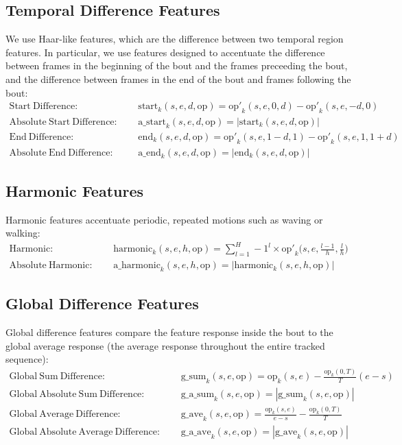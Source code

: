 \documentclass[10pt, onecolumn]{article}
\newcommand{\1}{\textbf{1}}
\begin{document}
\subsection{Temporal Difference Features}
We use Haar-like features, which are the difference between two temporal region features.  In particular, we use features designed to accentuate the difference between frames in the beginning of the bout and the frames preceeding the bout, and the difference between frames in the end of the bout and frames following the bout:
\begin{eqnarray*}
 \mathrm{Start\ Difference:\ \ } &&\mathrm{start}_k(s,e,d,\mathrm{op}) = \mathrm{op'}_k(s,e,0,d) - \mathrm{op'}_k(s,e,-d,0) \\
 \mathrm{Absolute\ Start\ Difference:\ \ } &&\mathrm{a\_start}_k(s,e,d,\mathrm{op}) = |\mathrm{start}_k(s,e,d,\mathrm{op})| \\
 \mathrm{End\ Difference:\ \ } &&\mathrm{end}_k(s,e,d,\mathrm{op}) = \mathrm{op'}_k(s,e,1-d,1) - \mathrm{op'}_k(s,e,1,1+d)\\
 \mathrm{Absolute\ End\ Difference:\ \ } &&\mathrm{a\_end}_k(s,e,d,\mathrm{op}) = |\mathrm{end}_k(s,e,d,\mathrm{op})| 
\end{eqnarray*}

\subsection{Harmonic Features}
Harmonic features accentuate periodic, repeated motions such as waving or walking:
\begin{eqnarray*}
  \mathrm{Harmonic:\ \ } && \mathrm{harmonic}_k(s,e,h,\mathrm{op})   = \sum_{l=1}^H -1^l \times \mathrm{op'}_k\bigg(s,e,\frac{l-1}{h},\frac{l}{h} \bigg)\\
  \mathrm{Absolute\ Harmonic:\ \ } &&\mathrm{a\_harmonic}_k(s,e,h,\mathrm{op}) = |\mathrm{harmonic}_k(s,e,h,\mathrm{op})|
\end{eqnarray*}

\subsection{Global Difference Features}
Global difference features compare the feature response inside the bout to the global average response (the average response throughout the entire tracked sequence):
\begin{eqnarray*}
  \mathrm{Global\ Sum\ Difference:\ \ } &&\mathrm{g\_sum}_k(s,e,\mathrm{op})  = \mathrm{op}_k(s,e) - \frac{\mathrm{op}_k(0,T)}{T}(e-s)\\
  \mathrm{Global\ Absolute\ Sum\ Difference:\ \ } && \mathrm{g\_a\_sum}_k(s,e,\mathrm{op}) = |\mathrm{g\_sum}_k(s,e,\mathrm{op})| \\
  \mathrm{Global\ Average\ Difference:\ \ } &&\mathrm{g\_ave}_k(s,e,\mathrm{op})  = \frac{\mathrm{op}_k(s,e)}{e-s} - \frac{\mathrm{op}_k(0,T)}{T}\\
  \mathrm{Global\ Absolute\ Average\ Difference:\ \ } && \mathrm{g\_a\_ave}_k(s,e,\mathrm{op}) = |\mathrm{g\_ave}_k(s,e,\mathrm{op})| 
\end{eqnarray*}
\end{document}
